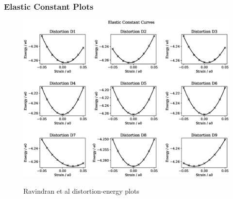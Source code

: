 \clearpage
\subsubsection{Elastic Constant Plots}

\begin{figure}[htb]
\centering
\includegraphics[width=.90\linewidth]{chapters/results_potential_fitting/fepd_potential/elastic_strains_bp_1.eps}  
\label{fig:fepd-fefcc-rose}
\caption{Ravindran et al\cite{dfttisiravindran} distortion-energy plots}
\end{figure}

